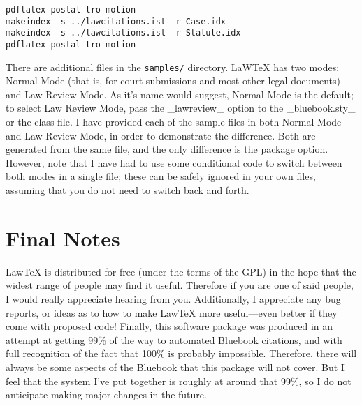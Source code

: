 \documentclass[letterpaper]{article}
\let\articleSection=\section
\let\section=\articleSection
\begin{document}
\begin{verbatim}
pdflatex postal-tro-motion
makeindex -s ../lawcitations.ist -r Case.idx
makeindex -s ../lawcitations.ist -r Statute.idx
pdflatex postal-tro-motion
\end{verbatim}

There are additional files in the {\tt samples/} directory. LaW\TeX{} has two modes: Normal Mode (that is, for court submissions and most other legal documents) and Law Review Mode. As it's name would suggest, Normal Mode is the default; to select Law Review Mode, pass the _lawreview_ option to the _bluebook.sty_ or the class file. I have provided each of the sample files in both Normal Mode and Law Review Mode, in order to demonstrate the difference. Both are generated from the same file, and the only difference is the package option. However, note that I have had to use some conditional code to switch between both modes in a single file; these can be safely ignored in your own files, assuming that you do not need to switch back and forth.

\makeatletter




\section{Final Notes}

Law\TeX{} is distributed for free (under the terms of the GPL) in the hope that the widest range of people may find it useful. Therefore if you are one of said people, I would really appreciate hearing from you. Additionally, I appreciate any bug reports, or ideas as to how to make Law\TeX{} more useful---even better if they come with proposed code! Finally, this software package was produced in an attempt at getting 99\% of the way to automated Bluebook citations, and with full recognition of the fact that 100\% is probably impossible. Therefore, there will always be some aspects of the Bluebook that this package will not cover. But I feel that the system I've put together is roughly at around that 99\%, so I do not anticipate making major changes in the future. 
 
\end{document}
